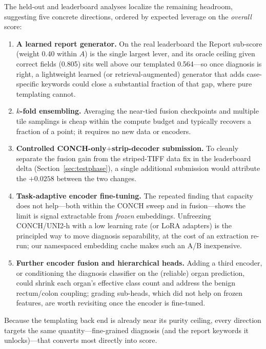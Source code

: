 \documentclass[11pt,a4paper]{article}
\begin{document}
The held-out and leaderboard analyses localize the remaining headroom, suggesting five concrete
directions, ordered by expected leverage on the \emph{overall} score:
\begin{enumerate}[leftmargin=1.4em,itemsep=2pt]
  \item \textbf{A learned report generator.} On the real leaderboard the Report sub-score (weight
        0.40 within $A$) is the single largest lever, and its oracle ceiling given correct fields
        (0.805) sits well above our templated 0.564---so once diagnosis is right, a lightweight
        learned (or retrieval-augmented) generator that adds case-specific keywords could close a
        substantial fraction of that gap, where pure templating cannot.
  \item \textbf{$k$-fold ensembling.} Averaging the near-tied fusion checkpoints and multiple tile
        samplings is cheap within the compute budget and typically recovers a fraction of a point;
        it requires no new data or encoders.
  \item \textbf{Controlled CONCH-only$+$strip-decoder submission.} To cleanly separate the fusion
        gain from the striped-TIFF data fix in the leaderboard delta (Section~\ref{sec:testphase}),
        a single additional submission would attribute the $+0.0258$ between the two changes.
  \item \textbf{Task-adaptive encoder fine-tuning.} The repeated finding that capacity does not
        help---both within the CONCH sweep and in fusion---shows the limit is signal extractable
        from \emph{frozen} embeddings. Unfreezing CONCH/UNI2-h with a low learning rate (or LoRA
        adapters) is the principled way to move diagnosis separability, at the cost of an
        extraction re-run; our namespaced embedding cache makes such an A/B inexpensive.
  \item \textbf{Further encoder fusion and hierarchical heads.} Adding a third encoder, or
        conditioning the diagnosis classifier on the (reliable) organ prediction, could shrink each
        organ's effective class count and address the benign rectum/colon coupling; grading
        sub-heads, which did not help on frozen features, are worth revisiting once the encoder is
        fine-tuned.
\end{enumerate}
Because the templating back end is already near its purity ceiling, every direction targets the
same quantity---fine-grained diagnosis (and the report keywords it unlocks)---that converts most
directly into score.
\end{document}
